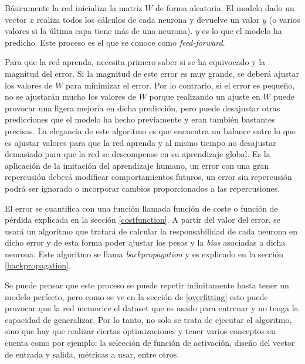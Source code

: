 Básicamente la red inicializa la matriz $W$ de forma aleatoria. El modelo dado un vector $x$ realiza todos los cálculos de cada neurona y devuelve un valor $y$ (o varios valores si la última capa tiene más de una neurona). $y$ es lo que el modelo ha predicho. Este proceso es el que se conoce como \textit{feed-forward}.
\newline

Para que la red aprenda, necesita primero saber si se ha equivocado y la magnitud del error. Si la magnitud de este error es muy grande, se deberá ajustar los valores de $W$ para minimizar el error. Por lo contrario, si el error es pequeño, no se ajustarán mucho los valores de $W$ porque realizando un ajuste en $W$ puede provocar una ligera mejoría en dicha predicción, pero puede desajustar otras predicciones que el modelo ha hecho previamente y eran también bastantes precisas. La elegancia de este algoritmo es que encuentra un balance entre lo que es ajustar valores para que la red aprenda y al mismo tiempo no desajustar demasiado para que la red se descompense en su aprendizaje global. Es la aplicación de la imitación del aprendizaje humano, un error con una gran repercusión deberá modificar comportamientos futuros, un error sin repercusión podrá ser ignorado o incorporar cambios proporcionados a las repercusiones.
\newline

El error se cuantifica con una función llamada función de coste o función de pérdida explicada en la sección \ref{costfunction}. A partir del valor del error, se usará un algoritmo que tratará de calcular la responsabilidad de cada neurona en dicho error y de esta forma poder ajustar los pesos y la \textit{bias} asociadas a dicha neurona. Este algoritmo se llama \textit{backpropagation} y es explicado en la sección \ref{backpropagation}.
\newline

Se puede pensar que este proceso se puede repetir infinitamente hasta tener un modelo perfecto, pero como se ve en la sección de \ref{overfitting} esto puede provocar que la red memorice el dataset que es usado para entrenar y no tenga la capacidad de generalizar. Por lo tanto, no solo se trata de ejecutar el algoritmo, sino que hay que realizar ciertas optimizaciones y tener varios conceptos en cuenta como por ejemplo: la selección de función de activación, diseño del vector de entrada y salida, métricas a usar, entre otros.
\newline

